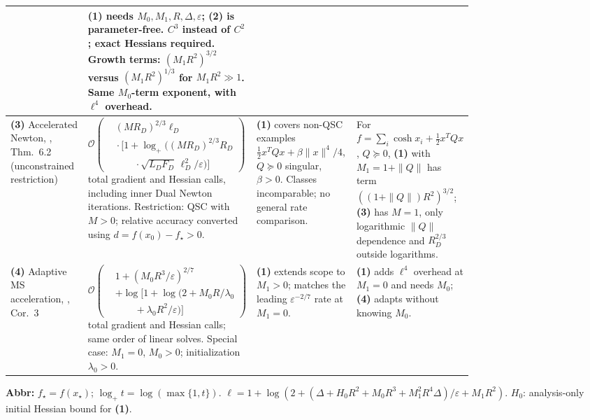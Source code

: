 \begin{table}[tp]
\begin{threeparttable}
\begin{tabularx}{\linewidth}{@{}>{\raggedright\arraybackslash}p{0.20\linewidth}>{\raggedright\arraybackslash}p{0.32\linewidth}>{\raggedright\arraybackslash}p{0.25\linewidth}>{\raggedright\arraybackslash}X@{}}
& \textbf{(1)} needs $M_0,M_1,R,\Delta,\varepsilon$; \textbf{(2)} is parameter-free. $C^3$ instead of $C^2$; exact Hessians required. Growth terms: $(M_1R^2)^{3/2}$ versus $(M_1R^2)^{1/3}$ for $M_1R^2\gg1$. Same $M_0$-term exponent, with $\ell^4$ overhead. \\
\midrule
\textbf{(3)} Accelerated Newton, \citep{hssDoikov2023v1}, Thm.~6.2 (unconstrained restriction)
& $\mathcal{O}\!\left(\begin{aligned}&(MR_D)^{2/3}\ell_D\\&{}\cdot\bigl[1+\log_+\!\bigl((MR_D)^{2/3}R_D\\&\qquad{}\cdot\sqrt{L_DF_D}\,\ell_D^2/\varepsilon\bigr)\bigr]\end{aligned}\right)$ total gradient and Hessian calls, including inner Dual Newton iterations. Restriction: QSC with $M>0$; relative accuracy converted using $d=f(x_0)-f_\star>0$.
& \textbf{(1)} covers non-QSC examples $\tfrac12x^TQx+\beta\|x\|^4/4$, $Q\succeq0$ singular, $\beta>0$. Classes incomparable; no general rate comparison.
& For $f=\sum_i\cosh x_i+\tfrac12x^TQx$, $Q\succeq0$, \textbf{(1)} with $M_1=1+\|Q\|$ has term $((1+\|Q\|)R^2)^{3/2}$; \textbf{(3)} has $M=1$, only logarithmic $\|Q\|$ dependence and $R_D^{2/3}$ outside logarithms. \\
\midrule
\textbf{(4)} Adaptive MS acceleration, \citep{phcCarmon2022v2}, Cor.~3
& $\mathcal{O}\!\left(\begin{aligned}&1+(M_0R^3/\varepsilon)^{2/7}\\&+\log\!\bigl[1+\log\!\bigl(2+M_0R/\lambda_0\\&\qquad{}+\lambda_0R^2/\varepsilon\bigr)\bigr]\end{aligned}\right)$ total gradient and Hessian calls; same order of linear solves. Special case: $M_1=0$, $M_0>0$; initialization $\lambda_0>0$.
& \textbf{(1)} extends scope to $M_1>0$; matches the leading $\varepsilon^{-2/7}$ rate at $M_1=0$.
& \textbf{(1)} adds $\ell^4$ overhead at $M_1=0$ and needs $M_0$; \textbf{(4)} adapts without knowing $M_0$. \\
\bottomrule
\end{tabularx}
\begin{tablenotes}[flushleft]\footnotesize
\item[] \textbf{Abbr:} $f_\star=f(x_\star)$; $\log_+t=\log(\max\{1,t\})$. $\ell=1+\log\!\left(2+(\Delta+H_0R^2+M_0R^3+M_1^2R^4\Delta)/\varepsilon+M_1R^2\right)$. $H_0$: analysis-only initial Hessian bound for \textbf{(1)}.

\end{tablenotes}
\end{threeparttable}
\end{table}
